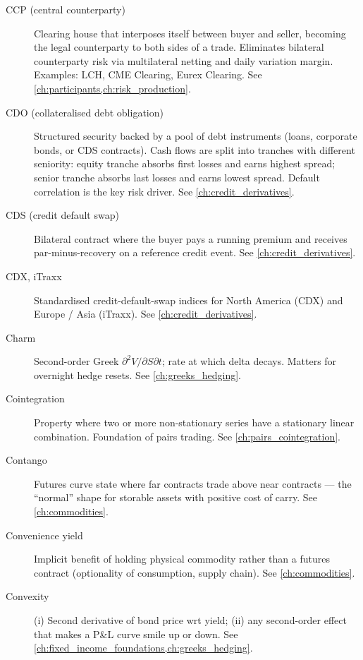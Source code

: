 \begin{description}
\item[CCP (central counterparty)]
Clearing house that interposes itself between buyer and seller,
becoming the legal counterparty to both sides of a trade. Eliminates
bilateral counterparty risk via multilateral netting and daily
variation margin. Examples: LCH, CME Clearing, Eurex Clearing.
See \cref{ch:participants,ch:risk_production}.

\item[CDO (collateralised debt obligation)]
Structured security backed by a pool of debt instruments (loans,
corporate bonds, or CDS contracts). Cash flows are split into tranches
with different seniority: equity tranche absorbs first losses and earns
highest spread; senior tranche absorbs last losses and earns lowest
spread. Default correlation is the key risk driver.
See \cref{ch:credit_derivatives}.

\item[CDS (credit default swap)]
Bilateral contract where the buyer pays a running premium and receives
par-minus-recovery on a reference credit event. See \cref{ch:credit_derivatives}.

\item[CDX, iTraxx]
Standardised credit-default-swap indices for North America (CDX) and
Europe / Asia (iTraxx). See \cref{ch:credit_derivatives}.

\item[Charm]
Second-order Greek $\partial^2 V/\partial S\partial t$; rate at which
delta decays. Matters for overnight hedge resets. See \cref{ch:greeks_hedging}.

\item[Cointegration]
Property where two or more non-stationary series have a stationary
linear combination. Foundation of pairs trading. See \cref{ch:pairs_cointegration}.

\item[Contango]
Futures curve state where far contracts trade above near contracts ---
the ``normal'' shape for storable assets with positive cost of carry.
See \cref{ch:commodities}.

\item[Convenience yield]
Implicit benefit of holding physical commodity rather than a futures
contract (optionality of consumption, supply chain). See \cref{ch:commodities}.

\item[Convexity]
(i) Second derivative of bond price wrt yield; (ii) any second-order
effect that makes a P\&L curve smile up or down. See \cref{ch:fixed_income_foundations,ch:greeks_hedging}.


\end{description}

